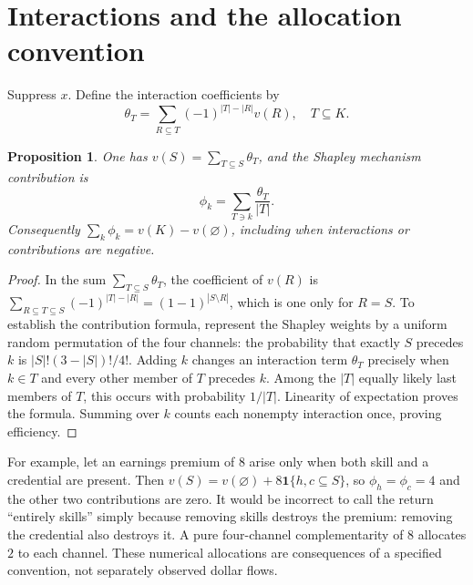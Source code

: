 \documentclass[11pt,a4paper]{article}
\newtheorem{proposition}[theorem]{Proposition}
\newcommand{\ind}{\mathbf 1}
\begin{document}
\section{Interactions and the allocation convention}
Suppress $x$. Define the interaction coefficients by
\[
 \theta_T=\sum_{R\subseteq T}(-1)^{|T|-|R|}v(R),\quad T\subseteq K.
\]
\begin{proposition}
One has $v(S)=\sum_{T\subseteq S}\theta_T$, and the Shapley mechanism contribution is
\[
 \phi_k=\sum_{T\ni k}\frac{\theta_T}{|T|}.
\]
Consequently $\sum_k\phi_k=v(K)-v(\varnothing)$, including when interactions or contributions are negative.
\end{proposition}
\begin{proof}
In the sum $\sum_{T\subseteq S}\theta_T$, the coefficient of $v(R)$ is
$\sum_{R\subseteq T\subseteq S}(-1)^{|T|-|R|}=(1-1)^{|S\setminus R|}$, which is one only for $R=S$. To establish the contribution formula, represent the Shapley weights by a uniform random permutation of the four channels: the probability that exactly $S$ precedes $k$ is $|S|!(3-|S|)!/4!$. Adding $k$ changes an interaction term $\theta_T$ precisely when $k\in T$ and every other member of $T$ precedes $k$. Among the $|T|$ equally likely last members of $T$, this occurs with probability $1/|T|$. Linearity of expectation proves the formula. Summing over $k$ counts each nonempty interaction once, proving efficiency.
\end{proof}
For example, let an earnings premium of $8$ arise only when both skill and a credential are present. Then $v(S)=v(\varnothing)+8\ind\{h,c\subseteq S\}$, so $\phi_h=\phi_c=4$ and the other two contributions are zero. It would be incorrect to call the return ``entirely skills'' simply because removing skills destroys the premium: removing the credential also destroys it. A pure four-channel complementarity of $8$ allocates $2$ to each channel. These numerical allocations are consequences of a specified convention, not separately observed dollar flows.
\end{document}
